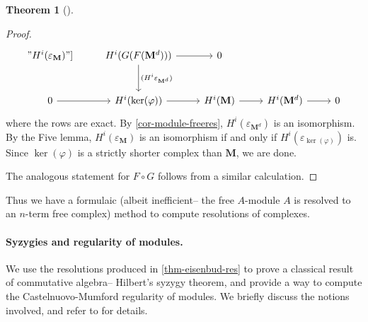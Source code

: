 \documentclass[a4paper]{article}
\theoremstyle{definition}
\newtheorem{theorem}[defn]{Theorem}
\theoremstyle{remark}
\begin{document}
\begin{theorem}[]
\begin{proof}
\[\begin{tikzcd}[row sep=large]
            "H^i(\varepsilon_\mathbf{M})"]
            & H^i(G(F(\mathbf{M}^d))) \arrow[r] \arrow[d, "(H^i
            \varepsilon_{\mathbf{M}^d})"]
            & 0 \\ 
            0 \arrow[r]
            & H^i(\ker(\varphi)) \arrow[r]
            & H^i(\mathbf{M}) \arrow[r]
            & H^i(\mathbf{M}^d) \arrow[r]
            & 0
        \end{tikzcd}\]
        where the rows are exact. By \cref{cor-module-freeres},
        \(H^i(\varepsilon_{\mathbf{M}^d})\) is an isomorphism. By the Five
        lemma, \(H^i(\varepsilon_\mathbf{M})\) is an isomorphism if and only if
        \(H^i(\varepsilon_{\ker(\varphi)})\) is. Since \(\ker(\varphi)\) is a
        strictly shorter complex than \(\mathbf{M}\), we are done.

        The analogous statement for \(F\circ G\) follows from a similar
        calculation.
    \end{proof}
\end{theorem}

Thus we have a formulaic (albeit inefficient-- the free \(A\)-module \(A\) is
resolved to an \(n\)-term free complex) method to compute resolutions of
complexes. 

\paragraph{Syzygies and regularity of modules.} We use the resolutions produced
in \cref{thm-eisenbud-res} to prove a classical result of commutative algebra--
Hilbert's syzygy theorem, and provide a way to compute the Castelnuovo-Mumford
regularity of modules. We briefly discuss the notions involved, and refer to
 for details.
\end{document}
